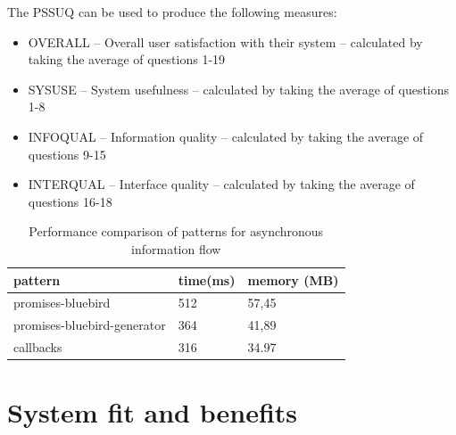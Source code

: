 The PSSUQ can be used to produce the following measures:
\begin{itemize}
	\item OVERALL – Overall user satisfaction with their system – calculated by taking the average of questions 1-19
	\item SYSUSE – System usefulness – calculated by taking the average of questions 1-8
	\item INFOQUAL – Information quality – calculated by taking the average of questions 9-15
	\item INTERQUAL – Interface quality – calculated by taking the average of questions 16-18
\end{itemize}
\begin{table}[h]
	\begin{center}
		\begin{tabular}{| l | l | l | }
			\hline
			\textbf{pattern} & \textbf{time(ms)} & \textbf{memory (MB)} \\
			\hline
			promises-bluebird & 512 & 57,45 \\
			\hline
			promises-bluebird-generator & 364 & 41,89 \\
			\hline
			callbacks & 316 & 34.97 \\
			\hline
		\end{tabular}
	\end{center}
	\caption{Performance comparison of patterns for asynchronous information flow \cite{asyncPerformance_2}\cite{asyncPerformance}}
\end{table}

\chapter{System fit and benefits}
\label{chap:fitsBenefits}

